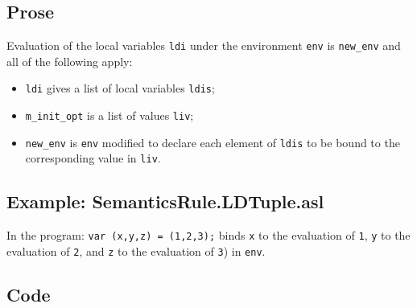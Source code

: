 \documentclass{book}
\begin{document}
    \subsection{Prose}
Evaluation of the local variables \texttt{ldi} under the environment
\texttt{env} is \texttt{new\_env} and all of the following apply:
    \begin{itemize}
    \item \texttt{ldi} gives a list of local variables \texttt{ldis};
    \item \texttt{m\_init\_opt} is a list of values \texttt{liv};
    \item \texttt{new\_env} is \texttt{env} modified to declare each element of \texttt{ldis} to be bound
      to the corresponding value in \texttt{liv}.
    \end{itemize}

    \subsection{Example: SemanticsRule.LDTuple.asl}
    In the program:
    \texttt{var (x,y,z) = (1,2,3);} binds \texttt{x} to the evaluation of
\texttt{1}, \texttt{y} to the evaluation of \texttt{2}, and \texttt{z} to the
evaluation of \texttt{3}) in \texttt{env}.

  \subsection{Code}
\end{document}
